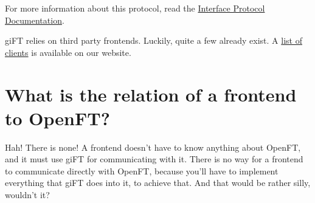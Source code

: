 \documentclass[10pt]{article}
\begin{document}
For more information about this protocol, read the
\href{http://gift.sourceforge.net/docs/?document=interface.html}{Interface
Protocol Documentation}.

giFT relies on third party frontends. Luckily, quite a few already exist. A
\href{http://gift.sourceforge.net/dev/clients.php}{list of clients} is
available on our website.

\section{What is the relation of a frontend to OpenFT?}
Hah! There is none! A frontend doesn't have to know anything about OpenFT, and
it must use giFT for communicating with it. There is no way for a frontend to
communicate directly with OpenFT, because you'll have to implement everything
that giFT does into it, to achieve that. And that would be rather silly,
wouldn't it?
\end{document}
